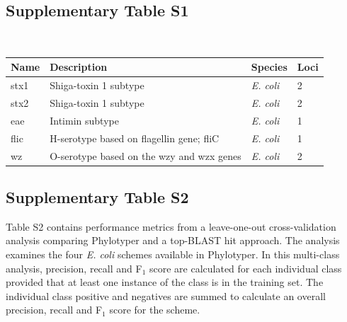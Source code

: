 \documentclass[11pt,letterpaper]{article}
\begin{document}
\subsection{Supplementary Table S1}

~

\begin{minipage}{\linewidth}
\centering
{}
\medskip
\begin{tabular}{@{}llll@{}}\toprule Name &
Description & Species & Loci\\\midrule
stx1 & Shiga-toxin 1 subtype & {\it E. coli} & 2 \\
stx2 & Shiga-toxin 1 subtype & {\it E. coli} & 2\\
eae & Intimin subtype & {\it E. coli} & 1\\
flic & H-serotype based on flagellin gene; fliC & {\it E. coli} & 1\\
wz & O-serotype based on the wzy and wzx genes & {\it E. coli} & 2\\\bottomrule
\end{tabular}\par

\end{minipage}

\clearpage

\subsection{Supplementary Table S2}

Table S2 contains performance metrics from a leave-one-out cross-validation analysis comparing Phylotyper and a top-BLAST hit approach.  The analysis examines the four \textit{E. coli} schemes available in Phylotyper. In this multi-class analysis, precision, recall and F$_{1}$ score are calculated for each individual class provided that at least one instance of the class is in the training set.  The individual class positive and negatives are summed to calculate an overall precision, recall and F$_{1}$ score for the scheme.

\end{document}
